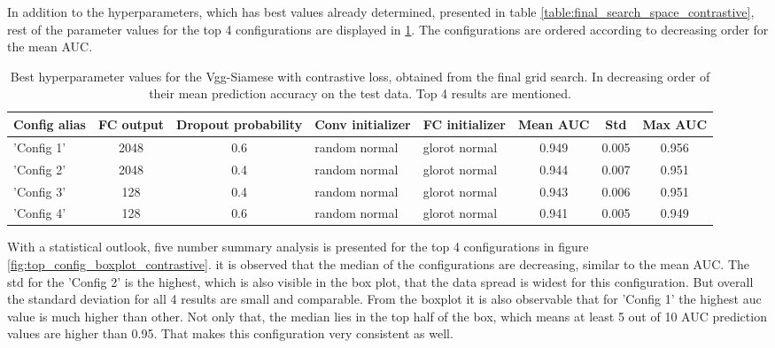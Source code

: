 In addition to the hyperparameters, which has best values already determined, presented in table \ref{table:final_search_space_contrastive}, rest of the parameter values for the top 4 configurations are displayed in 
\ref{table:contrastive_final_run_best_configs}. The configurations are ordered according to decreasing order for the mean AUC.
\begin{table}[ht]
\centering
\caption[Best hyperparameter values for the Vgg-Siamese with contrastive loss ...]{Best hyperparameter values for the Vgg-Siamese with contrastive loss, obtained from the final grid search. In decreasing order of their mean 
prediction accuracy on the test data. Top 4 results are mentioned.}
\resizebox{\textwidth}{!}
{\begin{tabular}{|l c c l l c c c|} 
 \hline\hline
 \rowcolor{lightgrey}
\textbf{Config alias} & \textbf{FC output} & \textbf{Dropout probability} & \textbf{Conv initializer} & \textbf{FC initializer} & \textbf{Mean AUC} & \textbf{Std} & \textbf{Max AUC}\\
\hline
'Config 1' & 2048 & 0.6 & random normal & glorot normal & 0.949 &  0.005 &  0.956 \\
'Config 2' & 2048 & 0.4 & random normal & glorot normal & 0.944 &  0.007 &  0.951 \\
'Config 3' & 128 & 0.4 & random normal & glorot normal & 0.943 &  0.006 &  0.951  \\
'Config 4' & 128 & 0.6 & random normal & glorot normal & 0.941 &  0.005 &  0.949 \\
\hline \hline
\end{tabular}}
\label{table:contrastive_final_run_best_configs}
\end{table}

With a statistical outlook, five number summary analysis is presented for the top 4 configurations in figure \ref{fig:top_config_boxplot_contrastive}. it is observed that the median of the configurations are decreasing, similar to the 
mean AUC. The std for the 'Config 2' is the highest, which is also visible in the box plot, that the data spread is widest for this configuration. But overall the standard deviation for all 4 results are small and comparable. From the 
boxplot it is also observable that for 'Config 1' the highest auc value is much higher than other. Not only that, the median lies in the top half of the box, which means at least 5 out of 10 AUC prediction values are higher than 0.95. 
That makes this configuration very consistent as well.

